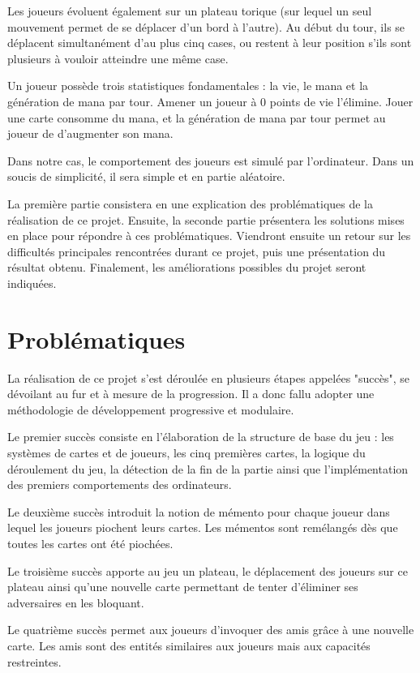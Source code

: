 \documentclass[12pt]{article}
\begin{document}
Les joueurs évoluent également sur un plateau torique (sur lequel un seul mouvement permet de se déplacer d'un bord à l'autre). Au début du tour, ils se déplacent simultanément d'au plus cinq cases, ou restent à leur position s'ils sont plusieurs à vouloir atteindre une même case.

Un joueur possède trois statistiques fondamentales : la vie, le mana et la génération de mana par tour. Amener un joueur à 0 points de vie l'élimine. Jouer une carte consomme du mana, et la génération de mana par tour permet au joueur de d'augmenter son mana.

Dans notre cas, le comportement des joueurs est simulé par l'ordinateur. Dans un soucis de simplicité, il sera simple et en partie aléatoire.

La première partie consistera en une explication des problématiques de la réalisation de ce projet. Ensuite, la seconde partie présentera les solutions mises en place pour répondre
à ces problématiques. Viendront ensuite un retour sur les difficultés principales rencontrées durant ce projet, puis une présentation du résultat obtenu. Finalement, les améliorations possibles du projet seront indiquées.

\section{Problématiques}

La réalisation de ce projet s'est déroulée en plusieurs étapes appelées "succès", se dévoilant au fur et à mesure de la progression. Il a donc fallu adopter une méthodologie de développement progressive et modulaire.

Le premier succès consiste en l'élaboration de la structure de base du jeu : les systèmes de cartes et de joueurs, les cinq premières cartes, la logique du déroulement du jeu, la détection de la fin de la partie ainsi que l'implémentation des premiers comportements des ordinateurs.

Le deuxième succès introduit la notion de mémento pour chaque joueur dans lequel les joueurs piochent leurs cartes. Les mémentos sont remélangés dès que toutes les cartes ont été piochées.

Le troisième succès apporte au jeu un plateau, le déplacement des joueurs sur ce plateau ainsi qu'une nouvelle carte permettant de tenter d'éliminer ses adversaires en les bloquant.

Le quatrième succès permet aux joueurs d'invoquer des amis grâce à une nouvelle carte. Les amis sont des entités similaires aux joueurs mais aux capacités restreintes.
\end{document}
